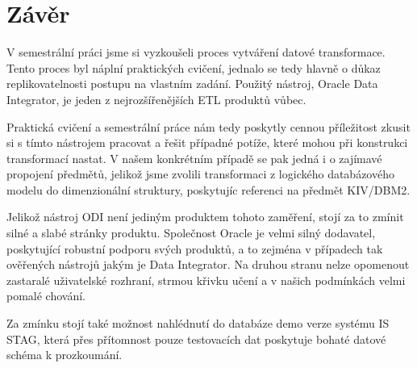 \section{Závěr}

V semestrální práci jsme si vyzkoušeli proces vytváření datové transformace.
Tento proces byl náplní praktických cvičení, jednalo se tedy hlavně o důkaz replikovatelnosti postupu na vlastním zadání.
Použitý nástroj, Oracle Data Integrator, je jeden z nejrozšířenějších ETL produktů vůbec.

Praktická cvičení a semestrální práce nám tedy poskytly cennou příležitost zkusit si s tímto nástrojem pracovat a řešit případné potíže, které mohou při konstrukci transformací nastat.
V našem konkrétním případě se pak jedná i o zajímavé propojení předmětů, jelikož jsme zvolili transformaci z logického databázového modelu do dimenzionální struktury, poskytujíc referenci na předmět KIV/DBM2.

Jelikož nástroj ODI není jediným produktem tohoto zaměření, stojí za to zmínit silné a slabé stránky produktu.
Společnost Oracle je velmi silný dodavatel, poskytující robustní podporu svých produktů, a to zejména v případech tak ověřených nástrojů jakým je Data Integrator.
Na druhou stranu nelze opomenout zastaralé uživatelské rozhraní, strmou křivku učení a v našich podmínkách velmi pomalé chování.

Za zmínku stojí také možnost nahlédnutí do databáze demo verze systému IS STAG, která přes přítomnost pouze testovacích dat poskytuje bohaté datové schéma k prozkoumání.

